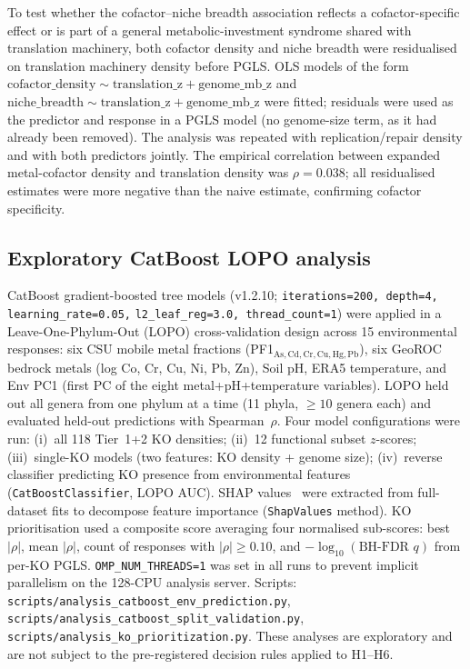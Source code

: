 \documentclass[times]{zHenriquesLab-StyleBioRxiv}
\begin{document}
To test whether the cofactor--niche breadth association reflects a cofactor-specific
effect or is part of a general metabolic-investment syndrome shared with
translation machinery, both cofactor density and niche breadth were residualised
on translation machinery density before PGLS. OLS models of the form
$\text{cofactor\_density} \sim \text{translation\_z} + \text{genome\_mb\_z}$
and $\text{niche\_breadth} \sim \text{translation\_z} + \text{genome\_mb\_z}$
were fitted; residuals were used as the predictor and response in a PGLS model
(no genome-size term, as it had already been removed). The analysis was repeated
with replication/repair density and with both predictors jointly. The empirical
correlation between expanded metal-cofactor density and translation density was
$\rho = 0.038$; all residualised estimates were more negative than the naive
estimate, confirming cofactor specificity.


\subsection{Exploratory CatBoost LOPO analysis}
\label{ss:catboost_methods}

CatBoost gradient-boosted tree models (v1.2.10;
\texttt{iterations=200, depth=4, learning\_rate=0.05,}
\texttt{l2\_leaf\_reg=3.0, thread\_count=1}) were applied in a
Leave-One-Phylum-Out (LOPO) cross-validation design across 15 environmental
responses: six CSU mobile metal fractions (PF1$_{\mathrm{As,Cd,Cr,Cu,Hg,Pb}}$),
six GeoROC bedrock metals (log Co, Cr, Cu, Ni, Pb, Zn), Soil pH, ERA5
temperature, and Env PC1 (first PC of the eight metal+pH+temperature variables).
LOPO held out all genera from one phylum at a time (11 phyla, $\geq\!10$ genera
each) and evaluated held-out predictions with Spearman~$\rho$.
Four model configurations were run: (i)~all 118 Tier~1+2 KO densities; (ii)~12
functional subset $z$-scores; (iii)~single-KO models (two features: KO density
+ genome size); (iv)~reverse classifier predicting KO presence from environmental
features (\texttt{CatBoostClassifier}, LOPO AUC).
SHAP values~\cite{lundberg2017} were extracted from full-dataset fits to decompose feature
importance (\texttt{ShapValues} method).
KO prioritisation used a composite score averaging four normalised sub-scores:
best $|\rho|$, mean $|\rho|$, count of responses with $|\rho|\geq 0.10$, and
$-\log_{10}(\text{BH-FDR }q)$ from per-KO PGLS.
\texttt{OMP\_NUM\_THREADS=1} was set in all runs to prevent implicit
parallelism on the 128-CPU analysis server.
Scripts: \texttt{scripts/analysis\_catboost\_env\_prediction.py},
\texttt{scripts/analysis\_catboost\_split\_validation.py},
\texttt{scripts/analysis\_ko\_prioritization.py}.
These analyses are exploratory and are not subject to the pre-registered
decision rules applied to H1--H6.
\end{document}
